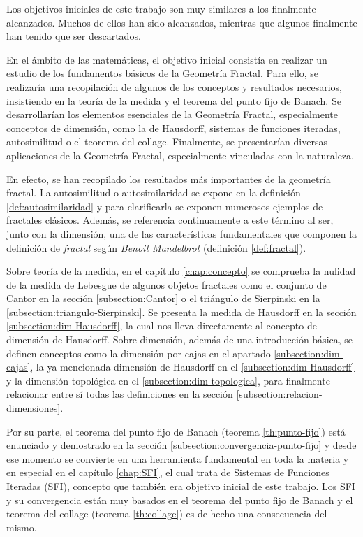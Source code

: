 Los objetivos iniciales de este trabajo son muy similares a los finalmente alcanzados. Muchos de ellos han sido alcanzados, mientras que algunos finalmente han tenido que ser descartados. 

En el ámbito de las matemáticas, el objetivo inicial consistía en realizar un estudio de los fundamentos básicos de la Geometría Fractal. Para ello, se realizaría una recopilación de algunos de los conceptos y resultados necesarios, insistiendo en la teoría de la medida y el teorema del punto fijo de Banach. Se desarrollarían los elementos esenciales de la Geometría Fractal, especialmente conceptos de dimensión, como la de Hausdorff, sistemas de funciones iteradas, autosimilitud o el teorema del collage. Finalmente, se presentarían diversas aplicaciones de la Geometría Fractal, especialmente vinculadas con la naturaleza.

En efecto, se han recopilado los resultados más importantes de la geometría fractal. La autosimilitud o autosimilaridad se expone en la definición \ref{def:autosimilaridad} y para clarificarla se exponen numerosos ejemplos de fractales clásicos. Además, se referencia continuamente a este término al ser, junto con la dimensión, una de las características fundamentales que componen la definición de \textit{fractal} según \textit{Benoit Mandelbrot} (definición \ref{def:fractal}).

Sobre teoría de la medida, en el capítulo \ref{chap:concepto} se comprueba la nulidad de la medida de Lebesgue de algunos objetos fractales como el conjunto de Cantor en la sección \ref{subsection:Cantor} o el triángulo de Sierpinski en la \ref{subsection:triangulo-Sierpinski}. Se presenta la medida de Hausdorff en la sección \ref{subsection:dim-Hausdorff}, la cual nos lleva directamente al concepto de dimensión de Hausdorff. Sobre dimensión, además de una introducción básica, se definen conceptos como la dimensión por cajas en el apartado \ref{subsection:dim-cajas}, la ya mencionada dimensión de Hausdorff en el \ref{subsection:dim-Hausdorff} y la dimensión topológica en el \ref{subsection:dim-topologica}, para finalmente relacionar entre sí todas las definiciones en la sección \ref{subsection:relacion-dimensiones}. 

Por su parte, el teorema del punto fijo de Banach (teorema \ref{th:punto-fijo}) está enunciado y demostrado en la sección \ref{subsection:convergencia-punto-fijo} y desde ese momento se convierte en una herramienta fundamental en toda la materia y en especial en el capítulo \ref{chap:SFI}, el cual trata de Sistemas de Funciones Iteradas (SFI), concepto que también era objetivo inicial de este trabajo. Los SFI y su convergencia están muy basados en el teorema del punto fijo de Banach y el teorema del collage (teorema \ref{th:collage}) es de hecho una consecuencia del mismo.

